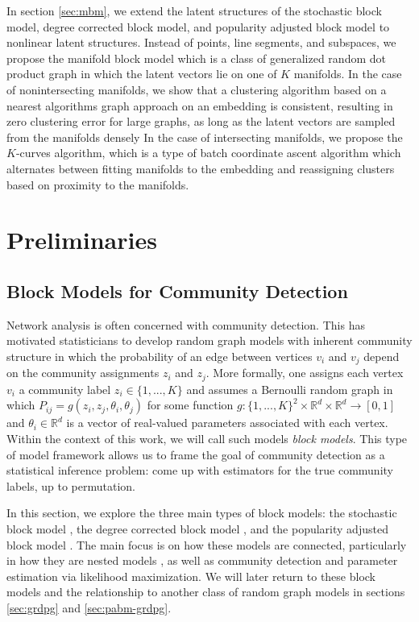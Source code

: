\documentclass[
  12pt,
]{article}
\theoremstyle{definition}
\theoremstyle{definition}
\theoremstyle{definition}
\theoremstyle{definition}
\theoremstyle{remark}
\begin{document}
In section \ref{sec:mbm}, we extend the latent structures of the stochastic block model, degree corrected block model, and popularity adjusted block model to nonlinear latent structures.
Instead of points, line segments, and subspaces, we propose the manifold block model which is a class of generalized random dot product graph in which the latent vectors lie on one of \(K\) manifolds.
In the case of nonintersecting manifolds, we show that a clustering algorithm based on a nearest algorithms graph approach on an embedding is consistent, resulting in zero clustering error for large graphs, as long as the latent vectors are sampled from the manifolds densely
In the case of intersecting manifolds, we propose the \(K\)-curves algorithm, which is a type of batch coordinate ascent algorithm which alternates between fitting manifolds to the embedding and reassigning clusters based on proximity to the manifolds.

\newpage

\hypertarget{preliminaries}{%
\section{Preliminaries}\label{preliminaries}}

\hypertarget{sec:blockmodel}{%
\subsection{Block Models for Community Detection}\label{sec:blockmodel}}

Network analysis is often concerned with community detection.
This has motivated statisticians to develop random graph models with inherent community structure in which the probability of an edge between vertices \(v_i\) and \(v_j\) depend on the community assignments \(z_i\) and \(z_j\).
More formally, one assigns each vertex \(v_i\) a community label \(z_i \in \{1, ..., K\}\) and assumes a Bernoulli random graph in which \(P_{ij} = g(z_i, z_j, \theta_i, \theta_j)\) for some function \(g: \{1, ..., K\}^2 \times \mathbb{R}^d \times \mathbb{R}^d \to [0, 1]\) and \(\theta_i \in \mathbb{R}^d\) is a vector of real-valued parameters associated with each vertex.
Within the context of this work, we will call such models \emph{block models}.
This type of model framework allows us to frame the goal of community detection as a statistical inference problem:
come up with estimators for the true community labels, up to permutation.

In this section, we explore the three main types of block models:
the stochastic block model \citep{doi:10.1080/0022250X.1971.9989788}, the degree corrected block model \citep{Karrer_2011}, and the popularity adjusted block model \citep{307cbeb9b1be48299388437423d94bf1}.
The main focus is on how these models are connected, particularly in how they are nested models \citep{Noroozi2022}, as well as community detection and parameter estimation via likelihood maximization.
We will later return to these block models and the relationship to another class of random graph models in sections \ref{sec:grdpg} and \ref{sec:pabm-grdpg}.
\end{document}
